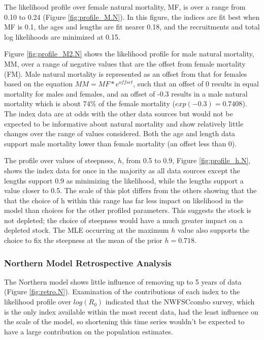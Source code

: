 \documentclass[12pt,]{article}
\begin{document}
The likelihood profile over female natural mortality, MF, is over a
range from 0.10 to 0.24 (Figure \ref{fig:profile_M.N}). In this figure,
the indices are fit best when MF is 0.1, the ages and lengths are fit
nearer 0.18, and the recruitments and total log likelihoods are
minimized at 0.15.

Figure \ref{fig:profile_M2.N} shows the likelihood profile for male
natural mortality, MM, over a range of negative values that are the
offset from female mortality (FM). Male natural mortality is represented
as an offset from that for females based on the equation
\({MM} = {MF}*e^{offset}\), such that an offset of 0 results in equal
mortality for males and females, and an offset of -0.3 results in a male
natural mortality which is about 74\% of the female mortality
(\(exp(-0.3) = 0.7408\)). The index data are at odds with the other data
sources but would not be expected to be informative about natural
mortality and show relatively little changes over the range of values
considered. Both the age and length data support male mortality lower
than female mortality (an offset less than 0).

The profile over values of steepness, \(h\), from 0.5 to 0.9, Figure
\ref{fig:profile_h.N}, shows the index data for once in the majority as
all data sources except the lengths support 0.9 as minimizing the
likelihood, while the lengths support a value closer to 0.5. The scale
of this plot differs from the others showing that the that the choice of
h within this range has far less impact on likelihood in the model than
choices for the other profiled parameters. This suggests the stock is
not depleted; the choice of steepness would have a much greater impact
on a depleted stock. The MLE occurring at the maximum \(h\) value also
supports the choice to fix the steepness at the mean of the prior
\(h=0.718\).

\subsubsection{Northern Model Retrospective
Analysis}\label{northern-model-retrospective-analysis}

The Northern model shows little influence of removing up to 5 years of
data (Figure \ref{fig:retro.N}). Examination of the contributions of
each index to the likelihood profile over \(log(R_0)\) indicated that
the NWFSCcombo survey, which is the only index available within the most
recent data, had the least influence on the scale of the model, so
shortening this time series wouldn't be expected to have a large
contribution on the population estimates.
\end{document}
